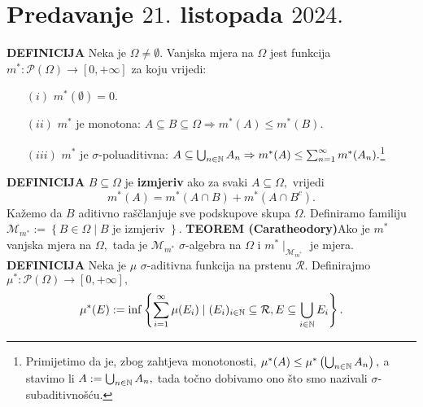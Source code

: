 \documentclass{article}
\begin{document}
\section{Predavanje \(21.\) listopada \(2024.\)}
\textbf{DEFINICIJA}\newline
Neka je \(\Omega\ne\emptyset.\) Vanjska mjera na \(\Omega\) jest funkcija \(m^*:\mathcal P(\Omega)\to[0,+\infty]\) za koju vrijedi:
\begin{enumerate}
    \item[\((i)\)] \(m^*(\emptyset)=0.\)
    \item[\((ii)\)] \(m^*\) je monotona: \(A\subseteq B\subseteq\Omega\Rightarrow m^*(A)\le m^*(B).\)
    \item[\((iii)\)] \(m^*\) je \(\sigma\)-poluaditivna: \(A\subseteq\bigcup_{n\in\Bbb N}A_n\Rightarrow m^*(A)\le\sum_{n=1}^\infty m^*(A_n).\)\footnote[45]{Primijetimo da je, zbog zahtjeva monotonosti, \(\mu^*(A)\le\mu^*\left(\bigcup_{n\in\Bbb N}A_n\right),\) a stavimo li \(A:=\bigcup_{n\in\Bbb N}A_n,\) tada točno dobivamo ono što smo nazivali \(\sigma\)-subaditivnošću.}
\end{enumerate}
\textbf{DEFINICIJA}\newline
\(B\subseteq\Omega\) je \textbf{izmjeriv} ako za svaki \(A\subseteq\Omega,\) vrijedi \[m^*(A)=m^*(A\cap B)+ m^*(A\cap B^c).\] Kažemo da \(B\) aditivno raščlanjuje sve podskupove skupa \(\Omega.\)\newline\newline
Definiramo familiju \(\mathcal M_{m^*}:=\left\{B\in\Omega\mid B\text{ je izmjeriv }\right\}.\)\newline\newline
\textbf{TEOREM (Caratheodory)}\newline Ako je \(m^*\) vanjska mjera na \(\Omega,\) tada je \(\mathcal M_{m^*}\) \(\sigma\)-algebra na \(\Omega\) i \(m^*\mid_{\mathcal M_{m^*}}\) je mjera.\newline\newline
\textbf{DEFINICIJA}\newline
Neka je \(\mu\) \(\sigma\)-aditivna funkcija na prstenu \(\mathcal R.\) Definirajmo \(\mu^*:\mathcal P(\Omega)\to[0,+\infty],\) \[\mu^*(E):=\inf\left\{\sum_{i=1}^\infty\mu(E_i)\mid (E_i)_{i\in\Bbb N}\subseteq\mathcal R, E\subseteq\bigcup_{i\in\Bbb N}E_i\right\}.\] 
\end{document}
